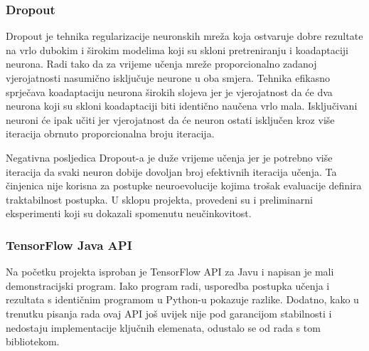 \documentclass[times, utf8, numeric, diplomski]{fer}
\def\TODO#1{\noindent\textcolor{red}{TODO: \textit{#1}}\newline}
\def\todo#1{\TODO{#1}}
\begin{document}
\subsubsection{Dropout}
Dropout \citep{dropout} je tehnika regularizacije neuronskih mreža koja ostvaruje dobre rezultate na vrlo dubokim i širokim modelima koji su skloni pretreniranju i koadaptaciji neurona. Radi tako da za vrijeme učenja mreže proporcionalno zadanoj vjerojatnosti nasumično isključuje neurone u oba smjera. Tehnika efikasno sprječava koadaptaciju neurona širokih slojeva jer je vjerojatnost da će dva neurona koji su skloni koadaptaciji biti identično naučena vrlo mala. Isključivani neuroni će ipak učiti jer vjerojatnost da će neuron ostati isključen kroz više iteracija obrnuto proporcionalna broju iteracija.

Negativna posljedica Dropout-a je duže vrijeme učenja jer je potrebno više iteracija da svaki neuron dobije dovoljan broj efektivnih iteracija učenja. Ta činjenica nije korisna za postupke neuroevolucije kojima trošak evaluacije definira traktabilnost postupka. U sklopu projekta, provedeni su i preliminarni eksperimenti koji su dokazali spomenutu neučinkovitost.

\subsubsection{TensorFlow Java API}
Na početku projekta isproban je TensorFlow API za Javu i napisan je mali demonstracijski program. Iako program radi, usporedba postupka učenja i rezultata s identičnim programom u Python-u pokazuje razlike. Dodatno, kako u trenutku pisanja rada ovaj API još uvijek nije pod garancijom stabilnosti i nedostaju implementacije ključnih elemenata, odustalo se od rada s tom bibliotekom.

%
\end{document}
